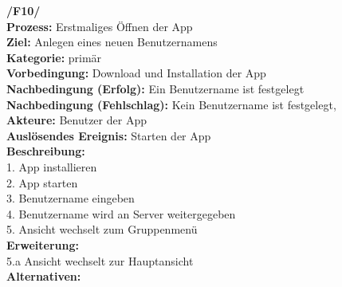 \textbf{/F10/} \\
\textbf{Prozess:} Erstmaliges Öffnen der App \\
\textbf{Ziel:} Anlegen eines neuen Benutzernamens \\
\textbf{Kategorie:} primär \\
\textbf{Vorbedingung:} Download und Installation der App \\
\textbf{Nachbedingung (Erfolg):} Ein Benutzername ist festgelegt \\
\textbf{Nachbedingung (Fehlschlag):} Kein Benutzername ist festgelegt,\\
\textbf{Akteure:} Benutzer der App \\
\textbf{Auslösendes Ereignis:} Starten der App\\
\textbf{Beschreibung:} \\
1. App installieren \\
2. App starten       \\
3. Benutzername eingeben \\
4. Benutzername wird an Server weitergegeben \\
5. Ansicht wechselt zum Gruppenmenü \\
\textbf{Erweiterung:} \\
5.a Ansicht wechselt zur Hauptansicht\\
\textbf{Alternativen:}
\\
\begin{figure} [H]
	\centering
	
\end{figure}



